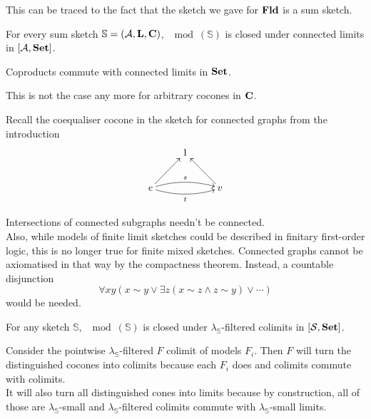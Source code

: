 This can be traced to the fact that the sketch we gave for $\mathbf{Fld}$ is a sum sketch. 

\begin{Proposition}
For every sum sketch $\mathbb S = (\mathcal{A}, \textbf{L}, \textbf{C})$, $\mod(\mathbb S)$ is closed under connected limits in $[\mathcal{A},\mathbf{Set}]$.
\end{Proposition}
\begin{Proof}
Coproducts commute with connected limits in $\mathbf{Set}$.
\end{Proof}

This is not the case any more for arbitrary cocones in $\textbf{C}$.
\begin{Example} 
\label{ex:cxgraph}
Recall the coequaliser cocone in the sketch for connected graphs from the introduction
\[
\xymatrix{
& 1 \\
e \ar@/^/[rr]^{s} \ar@/_/[rr]_{t} \ar[ru] & & v \ar[lu] \\
}\]
\end{Example}
Intersections of connected subgraphs needn't be connected. \\

Also, while models of finite limit sketches could be described in finitary first-order logic, this is no longer true for finite mixed sketches. Connected graphs cannot be axiomatised in that way by the compactness theorem. Instead, a countable disjunction
\[ \forall x y \left(x \sim y \vee \exists z(x \sim z \wedge z \sim y) \vee \cdots\right) \] would be needed.

\begin{Proposition}\label{prop:modsdirectedcolimits}
For any sketch $\mathbb S$, $\mod(\mathbb S)$ is closed under $\lambda_\mathbb S$-filtered colimits in $[\mathcal{S},\mathbf{Set}]$.
\end{Proposition}
\begin{Proof}
Consider the pointwise $\lambda_\mathbb S$-filtered $F$ colimit of models $F_i$. Then $F$ will turn the distinguished cocones into colimits because each $F_i$ does and colimits commute with colimits. \\

It will also turn all distinguished cones into limits because by construction, all of those are $\lambda_\mathbb S$-small and $\lambda_\mathbb S$-filtered colimits commute with $\lambda_\mathbb S$-small limits.
\end{Proof}